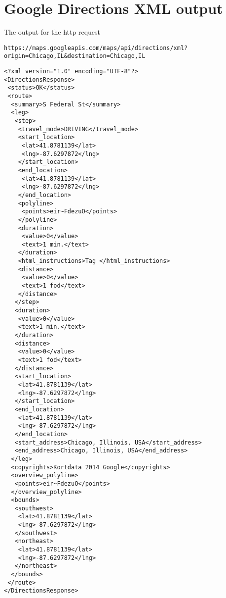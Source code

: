 \chapter{Google Directions XML output}\label{gdir}
The output for the http request

\begin{lstlisting}
https://maps.googleapis.com/maps/api/directions/xml?origin=Chicago,IL&destination=Chicago,IL
\end{lstlisting}


\begin{lstlisting}
<?xml version="1.0" encoding="UTF-8"?>
<DirectionsResponse>
 <status>OK</status>
 <route>
  <summary>S Federal St</summary>
  <leg>
   <step>
    <travel_mode>DRIVING</travel_mode>
    <start_location>
     <lat>41.8781139</lat>
     <lng>-87.6297872</lng>
    </start_location>
    <end_location>
     <lat>41.8781139</lat>
     <lng>-87.6297872</lng>
    </end_location>
    <polyline>
     <points>eir~FdezuO</points>
    </polyline>
    <duration>
     <value>0</value>
     <text>1 min.</text>
    </duration>
    <html_instructions>Tag </html_instructions>
    <distance>
     <value>0</value>
     <text>1 fod</text>
    </distance>
   </step>
   <duration>
    <value>0</value>
    <text>1 min.</text>
   </duration>
   <distance>
    <value>0</value>
    <text>1 fod</text>
   </distance>
   <start_location>
    <lat>41.8781139</lat>
    <lng>-87.6297872</lng>
   </start_location>
   <end_location>
    <lat>41.8781139</lat>
    <lng>-87.6297872</lng>
   </end_location>
   <start_address>Chicago, Illinois, USA</start_address>
   <end_address>Chicago, Illinois, USA</end_address>
  </leg>
  <copyrights>Kortdata 2014 Google</copyrights>
  <overview_polyline>
   <points>eir~FdezuO</points>
  </overview_polyline>
  <bounds>
   <southwest>
    <lat>41.8781139</lat>
    <lng>-87.6297872</lng>
   </southwest>
   <northeast>
    <lat>41.8781139</lat>
    <lng>-87.6297872</lng>
   </northeast>
  </bounds>
 </route>
</DirectionsResponse>

\end{lstlisting}